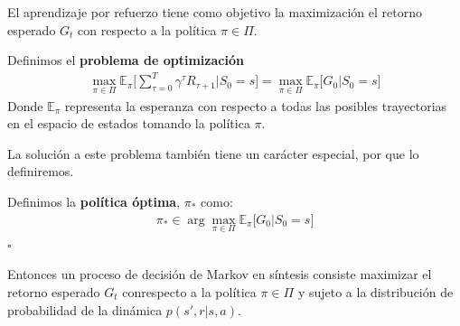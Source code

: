 El aprendizaje por refuerzo tiene como objetivo la maximización el retorno esperado $G_t$ con respecto a la política $\pi \in \Pi$. 

\begin{problem}
    Definimos el \textbf{problema de optimización}
    \begin{gather}
              \label{eq:OCP}
            \max_{\pi \in \Pi}\mathbb{E}_\pi\bigg[ \sum_{\tau=0}^T \gamma^{\tau}R_{\tau+1} \bigg| S_0 = s \bigg] = 
            \max_{\pi \in \Pi}\mathbb{E}_\pi\big[G_0\big| S_0 = s\big]
    \end{gather}
    Donde $\mathbb{E}_\pi$ representa la esperanza con respecto a todas las posibles trayectorias en el espacio de estados tomando la política $\pi$. 
\end{problem}
La solución a este problema también tiene un carácter especial, por que lo definiremos.

\begin{defi}
    Definimos la \textbf{política óptima}, $\pi_*$ como:
    \begin{gather}
        \pi_* \in \arg \max_{\pi \in \Pi}\mathbb{E}_{\pi}\big[G_0| S_0 = s\big]  
    \end{gather}
\hfill\ensuremath{\square}
\end{defi}

Entonces un proceso de decisión de Markov en síntesis consiste maximizar el retorno esperado $G_t$ conrespecto a la  política $\pi \in \Pi$ y sujeto a la distribución de probabilidad de la dinámica $p(s',r|s,a)$.
